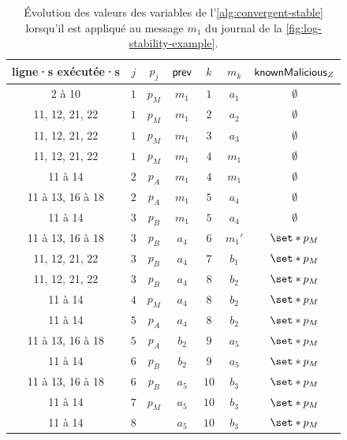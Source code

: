 \begin{table}[ht]
    \centering
    \begin{tabular}{ccccccc}
        ligne·s exécutée·s & $j$ & $p_j$ & $\operatorname{\mathsf{prev}}$ & $k$ & $m_k$ & $\operatorname{\mathsf{knownMalicious}}_Z$ \\
        \toprule
        2 à 10 & $1$ & $p_M$ & $m_1$ & $1$ & $a_1$ & $\emptyset$ \\
        11, 12, 21, 22 & $1$ & $p_M$ & $m_1$ & $2$ & $a_2$ & $\emptyset$ \\
        11, 12, 21, 22 & $1$ & $p_M$ & $m_1$ & $3$ & $a_3$ & $\emptyset$ \\
        11, 12, 21, 22 & $1$ & $p_M$ & $m_1$ & $4$ & $m_1$ & $\emptyset$ \\
        11 à 14 & $2$ & $p_A$ & $m_1$ & $4$ & $m_1$ & $\emptyset$ \\
        11 à 13, 16 à 18 & $2$ & $p_A$ & $m_1$ & $5$ & $a_4$ & $\emptyset$ \\
        11 à 14 & $3$ & $p_B$ & $m_1$ & $5$ & $a_4$ & $\emptyset$ \\
        11 à 13, 16 à 18 & $3$ & $p_B$ & $a_4$ & $6$ & $m_1'$ & $\set*{p_M}$ \\
        11, 12, 21, 22 & $3$ & $p_B$ & $a_4$ & $7$ & $b_1$ & $\set*{p_M}$ \\
        11, 12, 21, 22 & $3$ & $p_B$ & $a_4$ & $8$ & $b_2$ & $\set*{p_M}$ \\
        11 à 14 & $4$ & $p_M$ & $a_4$ & $8$ & $b_2$ & $\set*{p_M}$ \\
        11 à 14 & $5$ & $p_A$ & $a_4$ & $8$ & $b_2$ & $\set*{p_M}$ \\
        11 à 13, 16 à 18 & $5$ & $p_A$ & $b_2$ & $9$ & $a_5$ & $\set*{p_M}$ \\
        11 à 14 & $6$ & $p_B$ & $b_2$ & $9$ & $a_5$ & $\set*{p_M}$ \\
        11 à 13, 16 à 18 & $6$ & $p_B$ & $a_5$ & $10$ & $b_3$ & $\set*{p_M}$ \\
        11 à 14 & $7$ & $p_M$ & $a_5$ & $10$ & $b_3$ & $\set*{p_M}$ \\
        11 à 14 & $8$ & & $a_5$ & $10$ & $b_3$ & $\set*{p_M}$ \\
    \end{tabular}
    \caption{Évolution des valeurs des variables de l'\autoref{alg:convergent-stable} lorsqu'il est appliqué au message $m_1$ du journal de la \autoref{fig:log-stability-example}.}\label{tab:log-stability-example-algo-loop}
\end{table}


